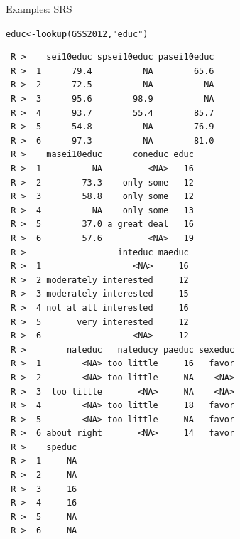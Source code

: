\documentclass[10pt]{beamer}\usepackage[]{graphicx}\usepackage[]{xcolor}
\makeatletter
\newcommand{\hlstr}[1]{\textcolor[rgb]{0.192,0.494,0.8}{#1}}%
\newcommand{\hlstd}[1]{\textcolor[rgb]{0.345,0.345,0.345}{#1}}%
\newcommand{\hlkwb}[1]{\textcolor[rgb]{0.69,0.353,0.396}{#1}}%
\newcommand{\hlkwd}[1]{\textcolor[rgb]{0.737,0.353,0.396}{\textbf{#1}}}%
\newenvironment{kframe}{%
 \def\at@end@of@kframe{}%
 \ifinner\ifhmode%
  \def\at@end@of@kframe{\end{minipage}}%
  \begin{minipage}{\columnwidth}%
 \fi\fi%
 \def\FrameCommand##1{\hskip\@totalleftmargin \hskip-\fboxsep
 \colorbox{shadecolor}{##1}\hskip-\fboxsep
     \hskip-\linewidth \hskip-\@totalleftmargin \hskip\columnwidth}%
 \MakeFramed {\advance\hsize-\width
   \@totalleftmargin\z@ \linewidth\hsize
   \@setminipage}}%
 {\par\unskip\endMakeFramed%
 \at@end@of@kframe}
\newenvironment{knitrout}{}{} %
\makeatother
\begin{document}
\begin{frame}[containsverbatim]{Examples: SRS}
\tiny
\begin{knitrout}
\color{fgcolor}\begin{kframe}
\begin{alltt}
\hlstd{educ} \hlkwb{<-} \hlkwd{lookup}\hlstd{(GSS2012,} \hlstr{"educ"}\hlstd{)}
\end{alltt}
\begin{verbatim}
 R >    sei10educ spsei10educ pasei10educ
 R >  1      79.4          NA        65.6
 R >  2      72.5          NA          NA
 R >  3      95.6        98.9          NA
 R >  4      93.7        55.4        85.7
 R >  5      54.8          NA        76.9
 R >  6      97.3          NA        81.0
 R >    masei10educ      coneduc educ
 R >  1          NA         <NA>   16
 R >  2        73.3    only some   12
 R >  3        58.8    only some   12
 R >  4          NA    only some   13
 R >  5        37.0 a great deal   16
 R >  6        57.6         <NA>   19
 R >                  inteduc maeduc
 R >  1                  <NA>     16
 R >  2 moderately interested     12
 R >  3 moderately interested     15
 R >  4 not at all interested     16
 R >  5       very interested     12
 R >  6                  <NA>     12
 R >        nateduc   nateducy paeduc sexeduc
 R >  1        <NA> too little     16   favor
 R >  2        <NA> too little     NA    <NA>
 R >  3  too little       <NA>     NA    <NA>
 R >  4        <NA> too little     18   favor
 R >  5        <NA> too little     NA   favor
 R >  6 about right       <NA>     14   favor
 R >    speduc
 R >  1     NA
 R >  2     NA
 R >  3     16
 R >  4     16
 R >  5     NA
 R >  6     NA
\end{verbatim}
\end{kframe}
\end{knitrout}
\end{frame}
\end{document}
